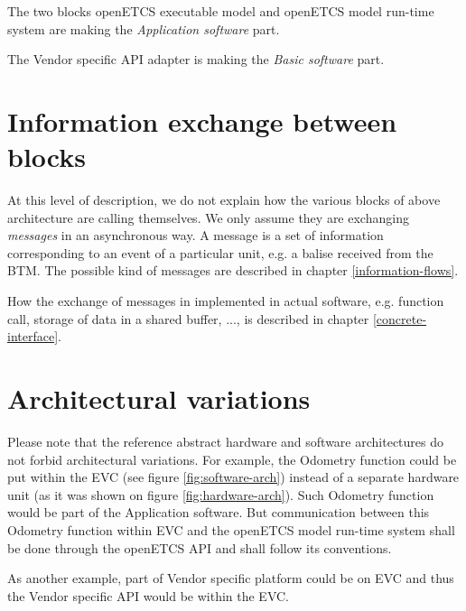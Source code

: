 The two blocks openETCS executable model and openETCS model run-time
system are making the \emph{Application software} part.

The Vendor specific API adapter is making the \emph{Basic software}
part.

\section{Information exchange between blocks}

At this level of description, we do not explain how the various blocks
of above architecture are calling themselves. We only assume they are
exchanging \emph{messages} in an asynchronous way. A message is a set
of information corresponding to an event of a particular unit, e.g. a
balise received from the BTM. The possible kind of messages are
described in chapter \ref{information-flows}.

How the exchange of messages in implemented in actual software,
e.g. function call, storage of data in a shared buffer, ..., is
described in chapter \ref{concrete-interface}.

\section{Architectural variations}
Please note that the reference abstract hardware and software
architectures do not forbid architectural variations. For example, the
Odometry function could be put within the EVC (see figure
\ref{fig:software-arch}) instead of a separate hardware unit (as it
was shown on figure \ref{fig:hardware-arch}). Such Odometry function
would be part of the Application software. But communication between
this Odometry function within EVC and the openETCS model run-time
system shall be done through the openETCS API and shall follow its
conventions.

As another example, part of Vendor specific platform could be on EVC
and thus the Vendor specific API would be within the EVC.


